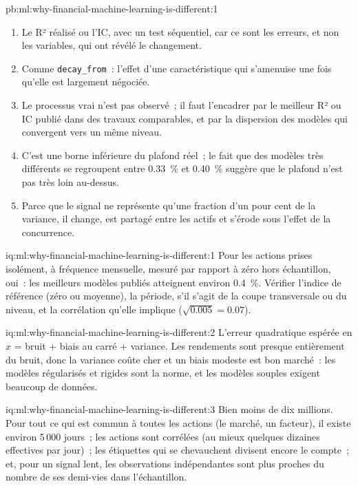 \begin{solution}{pb:ml:why-financial-machine-learning-is-different:1}
\begin{enumerate}
0.18~\%).
\item Le R² réalisé ou l'IC, avec un test séquentiel, car ce sont les erreurs, et non les variables, qui ont révélé le changement.
\item Comme \texttt{decay\_from}~: l'effet d'une caractéristique qui s'amenuise une fois qu'elle est largement négociée.
\item Le processus vrai n'est pas observé~; il faut l'encadrer par le meilleur R² ou IC publié dans des travaux comparables, et par la
dispersion des modèles qui convergent vers un même niveau.
\item C'est une borne inférieure du plafond réel~; le fait que des modèles très différents se regroupent entre 0.33~\% et 0.40~\% suggère que le
plafond n'est pas très loin au-dessus.
\item Parce que le signal ne représente qu'une fraction d'un pour cent de la variance, il change, est partagé entre les actifs
et s'érode sous l'effet de la concurrence.
\end{enumerate}
\end{solution}

\begin{solution}{iq:ml:why-financial-machine-learning-is-different:1}
Pour les actions prises isolément, à fréquence mensuelle, mesuré par rapport à zéro hors échantillon, oui~: les meilleurs modèles publiés atteignent environ
0.4~\%. Vérifier l'indice de référence (zéro ou moyenne), la période, s'il s'agit de la coupe transversale ou du niveau, et la
corrélation qu'elle implique ($\sqrt{0.005} = 0.07$).
\end{solution}

\begin{solution}{iq:ml:why-financial-machine-learning-is-different:2}
L'erreur quadratique espérée en $x$ = bruit + biais au carré + variance. Les rendements sont presque entièrement du bruit, donc la variance coûte cher
et un biais modeste est bon marché~: les modèles régularisés et rigides sont la norme, et les modèles souples exigent beaucoup de données.
\end{solution}

\begin{solution}{iq:ml:why-financial-machine-learning-is-different:3}
Bien moins de dix millions. Pour tout ce qui est commun à toutes les actions (le marché, un facteur), il existe environ 5\,000 jours~; les actions
sont corrélées (au mieux quelques dizaines effectives par jour)~; les étiquettes qui se chevauchent divisent encore le compte~; et, pour un signal lent, les
observations indépendantes sont plus proches du nombre de ses demi-vies dans l'échantillon.
\end{solution}

